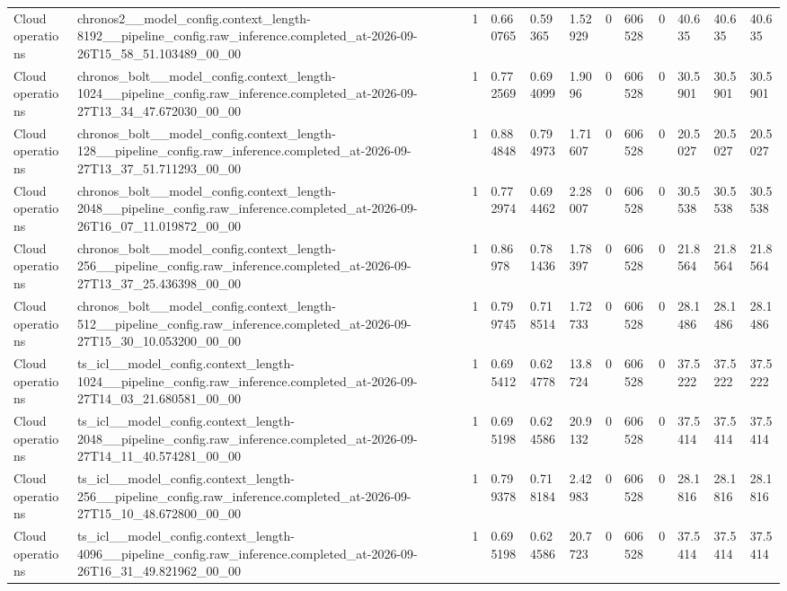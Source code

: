 \begin{tabular}{llllllllllll}
Cloud operations & chronos2\_\_model\_config.context\_length-8192\_\_pipeline\_config.raw\_inference.completed\_at-2026-09-26T15\_58\_51.103489\_00\_00 & 1 & 0.660765 & 0.59365 & 1.52929 & 0 & 606528 & 0 & 40.635 & 40.635 & 40.635 \\
Cloud operations & chronos\_bolt\_\_model\_config.context\_length-1024\_\_pipeline\_config.raw\_inference.completed\_at-2026-09-27T13\_34\_47.672030\_00\_00 & 1 & 0.772569 & 0.694099 & 1.9096 & 0 & 606528 & 0 & 30.5901 & 30.5901 & 30.5901 \\
Cloud operations & chronos\_bolt\_\_model\_config.context\_length-128\_\_pipeline\_config.raw\_inference.completed\_at-2026-09-27T13\_37\_51.711293\_00\_00 & 1 & 0.884848 & 0.794973 & 1.71607 & 0 & 606528 & 0 & 20.5027 & 20.5027 & 20.5027 \\
Cloud operations & chronos\_bolt\_\_model\_config.context\_length-2048\_\_pipeline\_config.raw\_inference.completed\_at-2026-09-26T16\_07\_11.019872\_00\_00 & 1 & 0.772974 & 0.694462 & 2.28007 & 0 & 606528 & 0 & 30.5538 & 30.5538 & 30.5538 \\
Cloud operations & chronos\_bolt\_\_model\_config.context\_length-256\_\_pipeline\_config.raw\_inference.completed\_at-2026-09-27T13\_37\_25.436398\_00\_00 & 1 & 0.86978 & 0.781436 & 1.78397 & 0 & 606528 & 0 & 21.8564 & 21.8564 & 21.8564 \\
Cloud operations & chronos\_bolt\_\_model\_config.context\_length-512\_\_pipeline\_config.raw\_inference.completed\_at-2026-09-27T15\_30\_10.053200\_00\_00 & 1 & 0.799745 & 0.718514 & 1.72733 & 0 & 606528 & 0 & 28.1486 & 28.1486 & 28.1486 \\
Cloud operations & ts\_icl\_\_model\_config.context\_length-1024\_\_pipeline\_config.raw\_inference.completed\_at-2026-09-27T14\_03\_21.680581\_00\_00 & 1 & 0.695412 & 0.624778 & 13.8724 & 0 & 606528 & 0 & 37.5222 & 37.5222 & 37.5222 \\
Cloud operations & ts\_icl\_\_model\_config.context\_length-2048\_\_pipeline\_config.raw\_inference.completed\_at-2026-09-27T14\_11\_40.574281\_00\_00 & 1 & 0.695198 & 0.624586 & 20.9132 & 0 & 606528 & 0 & 37.5414 & 37.5414 & 37.5414 \\
Cloud operations & ts\_icl\_\_model\_config.context\_length-256\_\_pipeline\_config.raw\_inference.completed\_at-2026-09-27T15\_10\_48.672800\_00\_00 & 1 & 0.799378 & 0.718184 & 2.42983 & 0 & 606528 & 0 & 28.1816 & 28.1816 & 28.1816 \\
Cloud operations & ts\_icl\_\_model\_config.context\_length-4096\_\_pipeline\_config.raw\_inference.completed\_at-2026-09-26T16\_31\_49.821962\_00\_00 & 1 & 0.695198 & 0.624586 & 20.7723 & 0 & 606528 & 0 & 37.5414 & 37.5414 & 37.5414 \\

\end{tabular}
